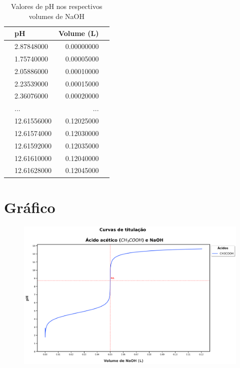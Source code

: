 \documentclass[a4paper, 12pt]{article}
\begin{document}
\begin{table}[H]
	\begin{center}
		\caption{Valores de pH nos respectivos volumes de NaOH}
		\label{demo-table}
		\begin{tabular}{rp{5cm}rp{5cm}}\toprule
			& \textbf{pH} & \textbf{Volume (L)} \\ \midrule			
			& 2.87848000 & 0.00000000 \\ 
			& 1.75740000 & 0.00005000 \\ 
			& 2.05886000 & 0.00010000 \\
			& 2.23539000 & 0.00015000 \\
			& 2.36076000 & 0.00020000 \\
			& ... & ... \\
			& 12.61556000 & 0.12025000 \\
			& 12.61574000 & 0.12030000 \\
			& 12.61592000 & 0.12035000 \\
			& 12.61610000 & 0.12040000 \\
			& 12.61628000 & 0.12045000 \\
			\bottomrule
		\end{tabular}
	\end{center}
\end{table}


\section{Gráfico}

\begin{figure}[H]
	\centering
	\includegraphics[width=0.99\linewidth]{../curva_de_titulacao_ac_acetico}
	\caption[Curva de titulação]{}
	\label{fig:curvadetitulacaoacacetico}
\end{figure}
\end{document}
